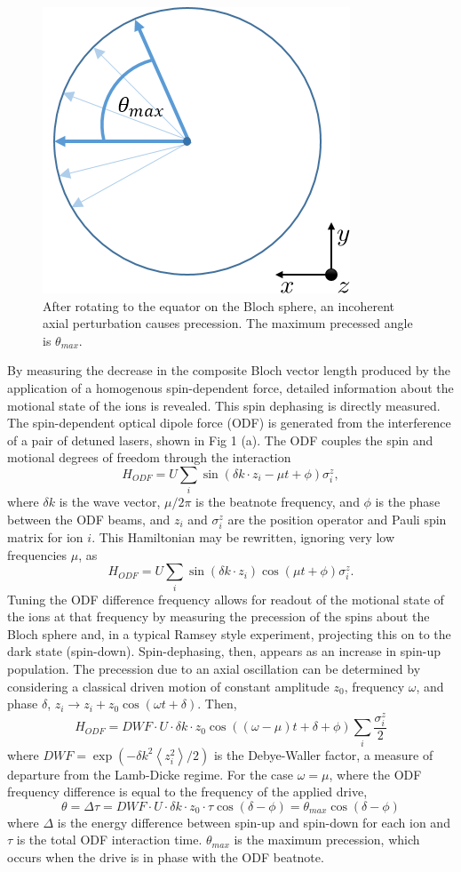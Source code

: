 \documentclass[aps,prl,twocolumn,groupedaddress]{revtex4-1}
\begin{document}
\begin{figure}
\includegraphics[width=.15\textwidth]{dephasing}
\caption{After rotating to the equator on the Bloch sphere, an incoherent axial perturbation causes precession. The maximum precessed angle is $\theta_{max}$.}\label{Fig 2}
\end{figure}
By measuring the decrease in the composite Bloch vector length produced by the application of a homogenous spin-dependent force, detailed information about the motional state of the ions is revealed. This spin dephasing is directly measured. The spin-dependent optical dipole force (ODF) is generated from the interference of a pair of detuned lasers, shown in Fig 1 (a). The ODF couples the spin and motional degrees of freedom through the interaction 
\begin{equation}
H_{ODF} = U\sum_{i}\sin(\delta k \cdot z_{i} - \mu t + \phi)\sigma^{z}_{i} ,
\end{equation}
where $\delta k$ is the wave vector, $\mu/2\pi$ is the beatnote frequency, and $\phi$ is the phase between the ODF beams, and $z_i$ and $\sigma^{z}_i$ are the position operator and Pauli spin matrix for ion $i$. This Hamiltonian may be rewritten, ignoring very low frequencies $\mu$, as
\[H_{ODF} = U\sum_{i}\sin(\delta k \cdot z_i)\cos(\mu t + \phi)\sigma^{z}_i. \]
Tuning the ODF difference frequency allows for readout of the motional state of the ions at that frequency by measuring the precession of the spins about the Bloch sphere and, in a typical Ramsey style experiment, projecting this on to the dark state (spin-down). Spin-dephasing, then, appears as an increase in spin-up population. The precession due to an axial oscillation can be determined by considering a classical driven motion of constant amplitude $z_{0}$, frequency $\omega$, and phase $\delta$, $z_i \rightarrow z_i +z_0\cos(\omega t+\delta)$.
Then,
\[H_{ODF} = DWF \cdot U \cdot \delta k \cdot z_0\cos((\omega - \mu)t + \delta + \phi) \sum_{i} \frac{\sigma^{z}_{i}}{2} \]
where $DWF = \exp(-\delta k^2 \left< z^{2}_{i} \right> / 2) $ is the Debye-Waller factor, a measure of departure from the Lamb-Dicke regime.
For the case $ \omega = \mu $, where the ODF frequency difference is equal to the frequency of the applied drive,
\[\theta = \Delta\tau = DWF \cdot U \cdot \delta k \cdot z_0 \cdot \tau \cos(\delta - \phi) = \theta_{max}\cos(\delta - \phi)\]
where $\Delta$ is the energy difference between spin-up and spin-down for each ion and $\tau$ is the total ODF interaction time. $\theta_{max}$ is the maximum precession, which occurs when the drive is in phase with the ODF beatnote.
\end{document}
